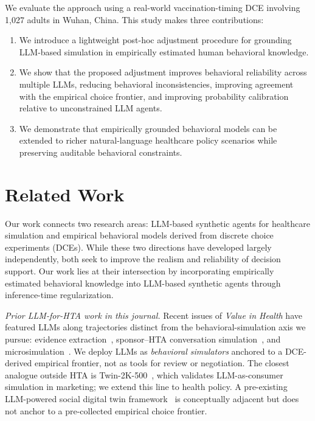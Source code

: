 \documentclass[11pt]{article}
\begin{document}
We evaluate the approach using a real-world vaccination-timing DCE involving 1,027 adults in Wuhan, China. This study makes three contributions:

\begin{enumerate}
    \item We introduce a lightweight post-hoc adjustment procedure for grounding LLM-based simulation in empirically estimated human behavioral knowledge.

    \item We show that the proposed adjustment improves behavioral reliability across multiple LLMs, reducing behavioral inconsistencies, improving agreement with the empirical choice frontier, and improving probability calibration relative to unconstrained LLM agents.

    \item We demonstrate that empirically grounded behavioral models can be extended to richer natural-language healthcare policy scenarios while preserving auditable behavioral constraints.
\end{enumerate}\section{Related Work}

Our work connects two research areas: LLM-based synthetic agents for healthcare simulation and empirical behavioral models derived from discrete choice experiments (DCEs). While these two directions have developed largely independently, both seek to improve the realism and reliability of decision support. Our work lies at their intersection by incorporating empirically estimated behavioral knowledge into LLM-based synthetic agents through inference-time regularization.

\emph{Prior LLM-for-HTA work in this journal.} Recent issues of \emph{Value in Health} have featured LLMs along trajectories distinct from the behavioral-simulation axis we pursue: evidence extraction~\citep{shree2025stability}, sponsor--HTA conversation simulation~\citep{luo2025sponsor}, and microsimulation~\citep{tornberg2025validation}. We deploy LLMs as \emph{behavioral simulators} anchored to a DCE-derived empirical frontier, not as tools for review or negotiation. The closest analogue outside HTA is Twin-2K-500~\citep{toubia2025twin}, which validates LLM-as-consumer simulation in marketing; we extend this line to health policy. A pre-existing LLM-powered social digital twin framework~\citep{koaik2026social} is conceptually adjacent but does not anchor to a pre-collected empirical choice frontier.
\end{document}
